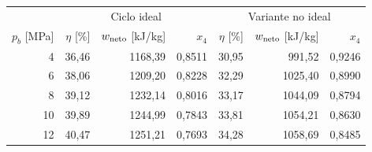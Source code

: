 \begin{tabular}{rrrrrrr}
\toprule
& \multicolumn{3}{c}{Ciclo ideal} & \multicolumn{3}{c}{Variante no ideal}\\
$p_b$ [MPa] & $\eta$ [\%] & $w_{\rm neto}$ [kJ/kg] & $x_4$ & $\eta$ [\%] & $w_{\rm neto}$ [kJ/kg] & $x_4$\\
\midrule
4 & 36,46 & 1168,39 & 0,8511 & 30,95 & 991,52 & 0,9246 \\
6 & 38,06 & 1209,20 & 0,8228 & 32,29 & 1025,40 & 0,8990 \\
8 & 39,12 & 1232,14 & 0,8016 & 33,17 & 1044,09 & 0,8794 \\
10 & 39,89 & 1244,99 & 0,7843 & 33,81 & 1054,21 & 0,8630 \\
12 & 40,47 & 1251,21 & 0,7693 & 34,28 & 1058,69 & 0,8485 \\
\bottomrule
\end{tabular}
